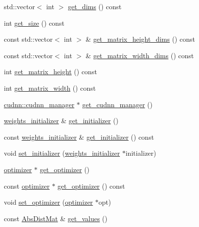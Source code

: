 \begin{DoxyCompactItemize}
std\+::vector$<$ int $>$ \hyperlink{classlbann_1_1weights_ac1f4e6725fc8b265e0ed5dfe140a321a}{get\+\_\+dims} () const
\item 
int \hyperlink{classlbann_1_1weights_a3216926df0aaf7aa440b9e5317d05fa2}{get\+\_\+size} () const
\item 
const std\+::vector$<$ int $>$ \& \hyperlink{classlbann_1_1weights_a2971f04c57d90fbb09631b1de3dad336}{get\+\_\+matrix\+\_\+height\+\_\+dims} () const
\item 
const std\+::vector$<$ int $>$ \& \hyperlink{classlbann_1_1weights_a783ce38ed0b75c0264dd7e28911d5ec0}{get\+\_\+matrix\+\_\+width\+\_\+dims} () const
\item 
int \hyperlink{classlbann_1_1weights_ad36676b9b43bced1cc7e332e3745411f}{get\+\_\+matrix\+\_\+height} () const
\item 
int \hyperlink{classlbann_1_1weights_abc3cf3a5b992302b1eaaea1fdf3b377d}{get\+\_\+matrix\+\_\+width} () const
\item 
\hyperlink{classlbann_1_1cudnn_1_1cudnn__manager}{cudnn\+::cudnn\+\_\+manager} $\ast$ \hyperlink{classlbann_1_1weights_ab8c007f217040d2c4a99acc1977d9d54}{get\+\_\+cudnn\+\_\+manager} ()
\item 
\hyperlink{classlbann_1_1weights__initializer}{weights\+\_\+initializer} \& \hyperlink{classlbann_1_1weights_a448c8a6fa03048da9f3ae275d29c824d}{get\+\_\+initializer} ()
\item 
const \hyperlink{classlbann_1_1weights__initializer}{weights\+\_\+initializer} \& \hyperlink{classlbann_1_1weights_aeaf4d47037d464922121223d4b0b6c33}{get\+\_\+initializer} () const
\item 
void \hyperlink{classlbann_1_1weights_a71e56d32d8e9c0e3ddf0ec2d0cd3924d}{set\+\_\+initializer} (\hyperlink{classlbann_1_1weights__initializer}{weights\+\_\+initializer} $\ast$initializer)
\item 
\hyperlink{classlbann_1_1optimizer}{optimizer} $\ast$ \hyperlink{classlbann_1_1weights_accdbbd16ada5b5b12890431b92c2e706}{get\+\_\+optimizer} ()
\item 
const \hyperlink{classlbann_1_1optimizer}{optimizer} $\ast$ \hyperlink{classlbann_1_1weights_a5754ec6534e1b47e2363c2848649f8a2}{get\+\_\+optimizer} () const
\item 
void \hyperlink{classlbann_1_1weights_ab641f66c09c8b5d491c0f262e8cb55e6}{set\+\_\+optimizer} (\hyperlink{classlbann_1_1optimizer}{optimizer} $\ast$opt)
\item 
const \hyperlink{base_8hpp_a9a697a504ae84010e7439ffec862b470}{Abs\+Dist\+Mat} \& \hyperlink{classlbann_1_1weights_a09fa4082be905c0c124dde3033e2461b}{get\+\_\+values} ()

\end{DoxyCompactItemize}
